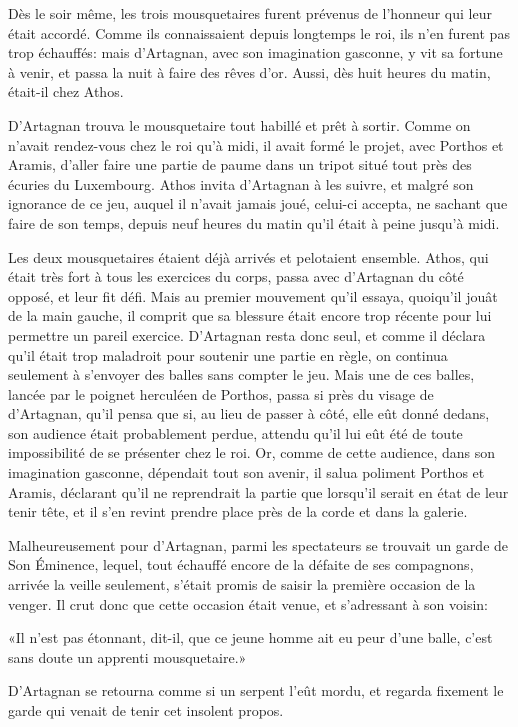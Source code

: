 Dès le soir même, les trois mousquetaires furent prévenus de l'honneur qui leur était accordé. Comme ils connaissaient depuis longtemps le roi, ils n'en furent pas trop échauffés: mais d'Artagnan, avec son imagination gasconne, y vit sa fortune à venir, et passa la nuit à faire des rêves d'or. Aussi, dès huit heures du matin, était-il chez Athos. 

D'Artagnan trouva le mousquetaire tout habillé et prêt à sortir. Comme on n'avait rendez-vous chez le roi qu'à midi, il avait formé le projet, avec Porthos et Aramis, d'aller faire une partie de paume dans un tripot situé tout près des écuries du Luxembourg. Athos invita d'Artagnan à les suivre, et malgré son ignorance de ce jeu, auquel il n'avait jamais joué, celui-ci accepta, ne sachant que faire de son temps, depuis neuf heures du matin qu'il était à peine jusqu'à midi. 

Les deux mousquetaires étaient déjà arrivés et pelotaient ensemble. Athos, qui était très fort à tous les exercices du corps, passa avec d'Artagnan du côté opposé, et leur fit défi. Mais au premier mouvement qu'il essaya, quoiqu'il jouât de la main gauche, il comprit que sa blessure était encore trop récente pour lui permettre un pareil exercice. D'Artagnan resta donc seul, et comme il déclara qu'il était trop maladroit pour soutenir une partie en règle, on continua seulement à s'envoyer des balles sans compter le jeu. Mais une de ces balles, lancée par le poignet herculéen de Porthos, passa si près du visage de d'Artagnan, qu'il pensa que si, au lieu de passer à côté, elle eût donné dedans, son audience était probablement perdue, attendu qu'il lui eût été de toute impossibilité de se présenter chez le roi. Or, comme de cette audience, dans son imagination gasconne, dépendait tout son avenir, il salua poliment Porthos et Aramis, déclarant qu'il ne reprendrait la partie que lorsqu'il serait en état de leur tenir tête, et il s'en revint prendre place près de la corde et dans la galerie. 

Malheureusement pour d'Artagnan, parmi les spectateurs se trouvait un garde de Son Éminence, lequel, tout échauffé encore de la défaite de ses compagnons, arrivée la veille seulement, s'était promis de saisir la première occasion de la venger. Il crut donc que cette occasion était venue, et s'adressant à son voisin: 

«Il n'est pas étonnant, dit-il, que ce jeune homme ait eu peur d'une balle, c'est sans doute un apprenti mousquetaire.» 

D'Artagnan se retourna comme si un serpent l'eût mordu, et regarda fixement le garde qui venait de tenir cet insolent propos. 

